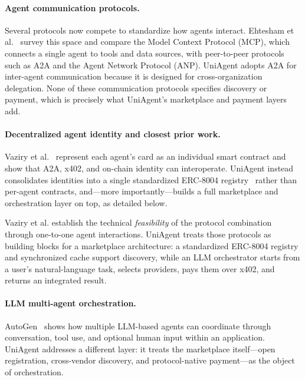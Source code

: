 \documentclass[sigconf]{acmart}
\begin{document}
\paragraph{Agent communication protocols.}
Several protocols now compete to standardize how agents interact.
Ehtesham et al.~\cite{ehtesham2025survey} survey this space and compare
the Model Context Protocol (MCP), which connects a single
agent to tools and data sources, with peer-to-peer protocols such as
A2A and the Agent Network Protocol (ANP). UniAgent adopts A2A for
inter-agent communication because it is designed for cross-organization
delegation. None of these communication protocols specifies discovery
or payment, which is precisely what UniAgent's marketplace and payment
layers add.

\paragraph{Decentralized agent identity and closest prior work.}
Vaziry et al.~\cite{vaziry2025} represent each agent's card as an
individual smart contract and show that A2A, x402, and on-chain identity
can interoperate. UniAgent instead consolidates identities into a single
standardized ERC-8004 registry~\cite{erc8004} rather than per-agent
contracts, and---more importantly---builds a full marketplace and
orchestration layer on top, as detailed below.

Vaziry et al. establish the technical \emph{feasibility} of the
protocol combination through one-to-one agent interactions. UniAgent
treats those protocols as building blocks for a marketplace
architecture: a standardized ERC-8004 registry and synchronized cache
support discovery, while an LLM orchestrator starts from a user's
natural-language task, selects providers, pays them over x402, and
returns an integrated result.

\paragraph{LLM multi-agent orchestration.}
AutoGen~\cite{wu2023autogen} shows how multiple LLM-based agents can
coordinate through conversation, tool use, and optional human input
within an application. UniAgent addresses a different layer: it treats
the marketplace itself---open registration, cross-vendor discovery, and
protocol-native payment---as the object of orchestration.
\end{document}
